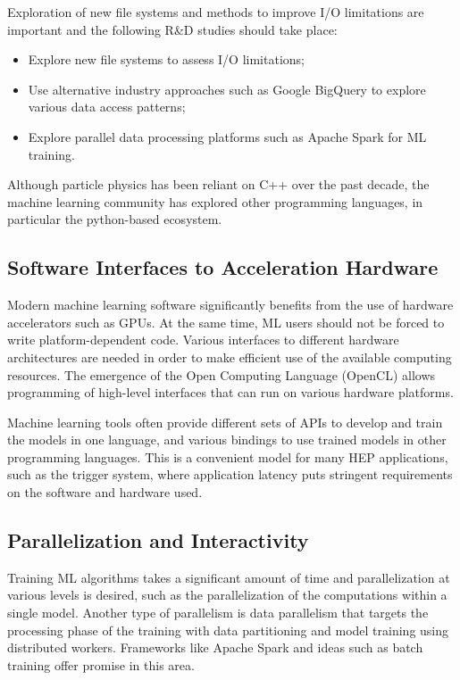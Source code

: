 Exploration of new file systems and methods to improve I/O limitations are important and the following R\&D studies should take place:
\begin{itemize}
 \item Explore new file systems to assess I/O limitations;
 \item Use alternative industry approaches such as Google BigQuery to explore various data access patterns;
 \item Explore parallel data processing platforms such as Apache Spark for ML training.
\end{itemize}

Although particle physics has been reliant on C++ over the past decade, the machine learning community has explored other programming languages, in particular the python-based ecosystem.

\subsection{Software Interfaces to Acceleration Hardware}\label{sec:software_proglang}
Modern machine learning software significantly benefits from the use of hardware accelerators such as GPUs. At the same time, ML users should not be forced to write platform-dependent code. Various interfaces to different hardware architectures are needed in order to make efficient use of the available computing resources. The emergence of the Open Computing Language (OpenCL) allows programming of high-level interfaces that can run on various hardware platforms.

Machine learning tools often provide different sets of APIs to develop and train the models in one language, and various bindings to use trained models in other programming languages. This is a convenient model for many HEP applications, such as the trigger system, where application latency puts stringent requirements on the software and hardware used.

\subsection{Parallelization and Interactivity}
Training ML algorithms takes a significant amount of time and parallelization at various levels is desired, such as the parallelization of the computations within a single model. Another type of parallelism is data parallelism that targets the processing phase of the training with data partitioning and model training using distributed workers. Frameworks like Apache Spark and ideas such as batch training offer promise in this area.

